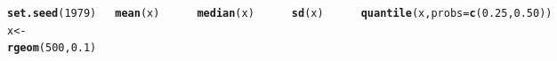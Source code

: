 \documentclass{beamer}\usepackage[]{graphicx}\usepackage[]{color}
\makeatletter
\newcommand{\hlnum}[1]{\textcolor[rgb]{0.686,0.059,0.569}{#1}}%
\newcommand{\hlstd}[1]{\textcolor[rgb]{0.345,0.345,0.345}{#1}}%
\newcommand{\hlkwb}[1]{\textcolor[rgb]{0.69,0.353,0.396}{#1}}%
\newcommand{\hlkwc}[1]{\textcolor[rgb]{0.333,0.667,0.333}{#1}}%
\newcommand{\hlkwd}[1]{\textcolor[rgb]{0.737,0.353,0.396}{\textbf{#1}}}%
\newenvironment{kframe}{%
 \def\at@end@of@kframe{}%
 \ifinner\ifhmode%
  \def\at@end@of@kframe{\end{minipage}}%
  \begin{minipage}{\columnwidth}%
 \fi\fi%
 \def\FrameCommand##1{\hskip\@totalleftmargin \hskip-\fboxsep
 \colorbox{shadecolor}{##1}\hskip-\fboxsep
     \hskip-\linewidth \hskip-\@totalleftmargin \hskip\columnwidth}%
 \MakeFramed {\advance\hsize-\width
   \@totalleftmargin\z@ \linewidth\hsize
   \@setminipage}}%
 {\par\unskip\endMakeFramed%
 \at@end@of@kframe}
\newenvironment{knitrout}{}{} %
\renewenvironment{knitrout}{\setlength{\topsep}{0mm}}{}
\makeatother
\begin{document}
\begin{frame}[fragile]%

\begin{columns}[c]


\begin{knitrout}\tiny
{}\color{fgcolor}\begin{kframe}
\begin{alltt}
\hlkwd{set.seed}\hlstd{(}\hlnum{1979}\hlstd{)}
\hlstd{x} \hlkwb{<-} \hlkwd{rgeom}\hlstd{(}\hlnum{500}\hlstd{,}\hlnum{0.1}\hlstd{)}

\hlkwd{mean}\hlstd{(x)}
\end{alltt}
\begin{verbatim}
## [1] 8.66
\end{verbatim}
\begin{alltt}
\hlkwd{median}\hlstd{(x)}
\end{alltt}
\begin{verbatim}
## [1] 6
\end{verbatim}
\begin{alltt}
\hlkwd{sd}\hlstd{(x)}
\end{alltt}
\begin{verbatim}
## [1] 8.846973
\end{verbatim}
\begin{alltt}
\hlkwd{quantile}\hlstd{(x,}\hlkwc{probs}\hlstd{=}\hlkwd{c}\hlstd{(}\hlnum{0.25}\hlstd{,}\hlnum{0.50}\hlstd{))}
\end{alltt}
\begin{verbatim}
## 25% 50% 
##   3   6
\end{verbatim}
\end{kframe}
\end{knitrout}


\end{columns}
\end{frame}
\end{document}
